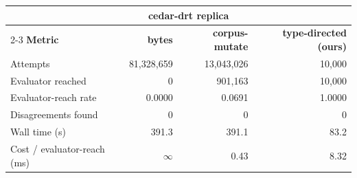 \begin{tabular}{lrrr}
\toprule
& \multicolumn{2}{c}{\textbf{cedar-drt replica}} & \\
\cmidrule(lr){2-3}
\textbf{Metric} & \textbf{bytes} & \textbf{corpus-mutate} & \textbf{type-directed (ours)} \\
\midrule
Attempts & 81,328,659 & 13,043,026 & 10,000 \\
Evaluator reached & 0 & 901,163 & 10,000 \\
Evaluator-reach rate & 0.0000 & 0.0691 & 1.0000 \\
Disagreements found & 0 & 0 & 0 \\
Wall time (s) & 391.3 & 391.1 & 83.2 \\
Cost / evaluator-reach (ms) & $\infty$ & 0.43 & 8.32 \\
\bottomrule
\end{tabular}
